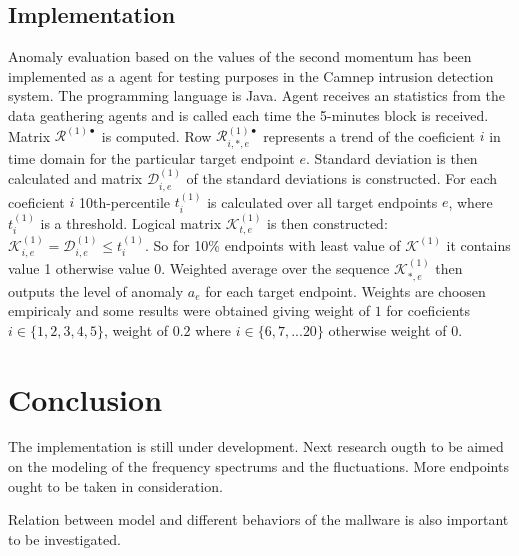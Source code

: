 \documentclass[a4paper,journal]{IEEEtran}
\begin{document}
\subsection{Implementation}
Anomaly evaluation based on the values of the second momentum has
been implemented as a agent for testing purposes in the Camnep
intrusion detection system. The programming language is Java.
Agent receives an statistics from the data geathering agents and
is called each time the 5-minutes block is received. Matrix
$\mathcal{R}^{(1)\bullet}$ is computed. Row
$\mathcal{R}^{(1)\bullet}_{i,*,e}$ represents a trend of the
coeficient $i$ in time domain for the particular target endpoint $e$.
Standard deviation is then calculated and matrix 
$\mathcal{D}^{(1)}_{i,e}$ of the standard deviations is constructed.
For each coeficient $i$ 10th-percentile $t^{(1)}_i$ is calculated
over all target endpoints $e$, where $t^{(1)}_i$ is a threshold.
Logical matrix $\mathcal{K}^{(1)}_{t,e}$ is then constructed:
$\mathcal{K}^{(1)}_{i,e} = \mathcal{D}^{(1)}_{i,e} \le t^{(1)}_i $.
So for 10\% endpoints with least value of $\mathcal{K}^{(1)}$
it contains value 1 otherwise value 0. Weighted average over the
sequence $\mathcal{K}^{(1)}_{*,e}$ then outputs the level of anomaly
$a_e$ for each target endpoint. 
Weights are choosen empiricaly and some results were obtained giving
weight of $1$ for coeficients $i \in \{1,2,3,4,5\}$, weight of $0.2$
where $i\in \{6,7,... 20\}$ otherwise weight of $0$.

\section{Conclusion}
The implementation is still under development. Next research ougth to be aimed on the modeling of the
frequency spectrums and the fluctuations. More endpoints ought to be taken in consideration. 

Relation between model and different behaviors of the mallware is also important to be investigated.

\clearpage
\onecolumn
\appendix
\end{document}
